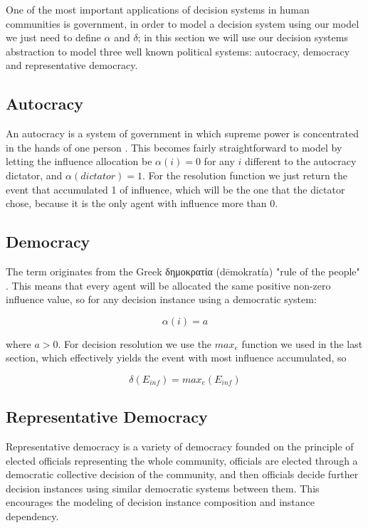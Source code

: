 One of the most important applications of decision systems in human communities is government, in order to model a decision system using our model we just need to define $\alpha$ and $\delta$; in this section we will use our decision systems abstraction to model three well known political systems: autocracy, democracy and representative democracy.

\subsection{Autocracy}

An autocracy is a system of government in which supreme power is concentrated in the hands of one person \cite{politicalterms}. This becomes fairly straightforward to model by letting the influence allocation be $\alpha(i) = 0$ for any $i$ different to the autocracy dictator, and $\alpha(dictator) = 1$. For the resolution function we just return the event that accumulated 1 of influence, which will be the one that the dictator chose, because it is the only agent with influence more than 0.

\subsection{Democracy}

The term originates from the Greek δημοκρατία (dēmokratía) "rule of the people" \cite{greeklexicon}. This means that every agent will be allocated the same positive non-zero influence value, so for any decision instance using a democratic system: 

$$\alpha(i) = a $$

where $a > 0$. For decision resolution we use the $max_e$ function we used in the last section, which effectively yields the event with most influence accumulated, so

$$\delta(E_{inf}) = max_e(E_{inf})$$

\subsection{Representative Democracy}

Representative democracy is a variety of democracy founded on the principle of elected officials representing the whole community, officials are elected through a democratic collective decision of the community, and then officials decide further decision instances using similar democratic systems between them. This encourages the modeling of decision instance composition and instance dependency.


